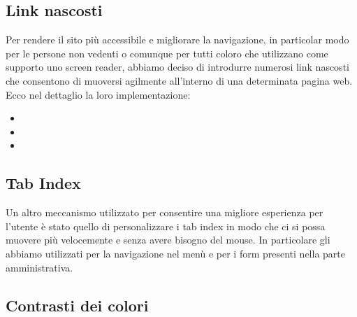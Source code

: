 \subsection{Link nascosti}
Per rendere il sito pi\`u accessibile e migliorare la navigazione, in particolar modo per le persone non vedenti o comunque per tutti coloro che utilizzano come supporto uno screen reader, abbiamo deciso di introdurre numerosi link nascosti che consentono di muoversi agilmente all'interno di una determinata pagina web. \\
Ecco nel dettaglio la loro implementazione:
	\begin{itemize}
		\item
		\item
		\item
	\end{itemize}
\subsection{Tab Index}
Un altro meccanismo utilizzato per consentire una migliore esperienza per l'utente \`e stato quello di personalizzare i tab index in modo che ci si possa muovere pi\`u velocemente e senza avere bisogno del mouse.
In particolare gli abbiamo utilizzati per la navigazione nel men\`u e per i form presenti nella parte amministrativa.

\subsection{Contrasti dei colori}